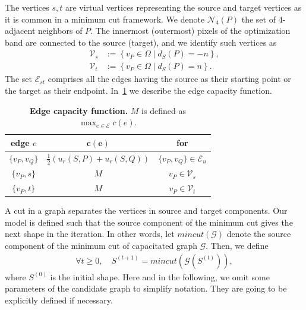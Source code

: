 \documentclass[review]{siamart220329}
\begin{document}
The vertices $s,t$ are virtual vertices representing the source and target vertices as it is common in a minimum cut framework. We denote $\mathcal{N}_4(P)$ the set of $4$-adjacent neighbors of $P$. The innermost (outermost) pixels of the optimization band are connected to the source (target), and we identify such vertices as
%
%
\begin{align*}
	\mathcal{V}_s &:=\left\{ v_P \in \Omega \; | \; d_{S}(P) = -n \right\}, \\
	\mathcal{V}_t &:=\left\{ v_P \in \Omega \; | \; d_{S}(P) = n \right\}.
\end{align*}
%
%
The set $\mathcal{E}_{st}$ comprises all the edges having the source as their starting point or the target as their endpoint. In~\cref{tab:edge-capacity} we describe the edge capacity function.
%
%
\begin{table}
\footnotesize
	\caption{\textbf{Edge capacity function.} $M$ is defined as $\max_{e \in \mathcal{E} }{ c(e) }$.}\label{tab:edge-capacity}
\begin{center}
\begin{tabular}{|c|c|c|}
\hline
\textbf{edge} $e$ & $\mathbf{c(e)}$ & \textbf{for}\\
\hline
$\{v_P, v_Q\}$ & $ \frac{1}{2}\left( u_r(S,P) + u_r(S,Q) \right) $ & $\{v_P,v_Q\} \in \mathcal{E}_{u}$\\
\hline
$\{v_P, s\}$ & $M$ & $v_P \in \mathcal{V}_{s}$ \\
\hline
$\{v_P, t\}$ & $M$ & $v_P \in \mathcal{V}_{t}$ \\
\hline
\end{tabular}
\end{center}
\end{table}
%
%

A cut in a graph separates the vertices in source and target components. Our model is defined such that the source component of the minimum cut gives the next shape in the iteration. In other words, let $mincut(\mathcal{G})$ denote the source component of the minimum cut of capacitated graph $\mathcal{G}$. Then, we define
%
%
\begin{align}
	\forall t \geq0, \quad S^{(t+1)} = mincut\left( \mathcal{G}(S^{(t)}) \right), 
	\label{eq:no-neighborhood-process}
\end{align}
%
%
where $S^{(0)}$ is the initial shape. Here and in the following, we omit some parameters of the candidate graph to simplify notation. They are going to be explicitly defined if necessary.
\end{document}
